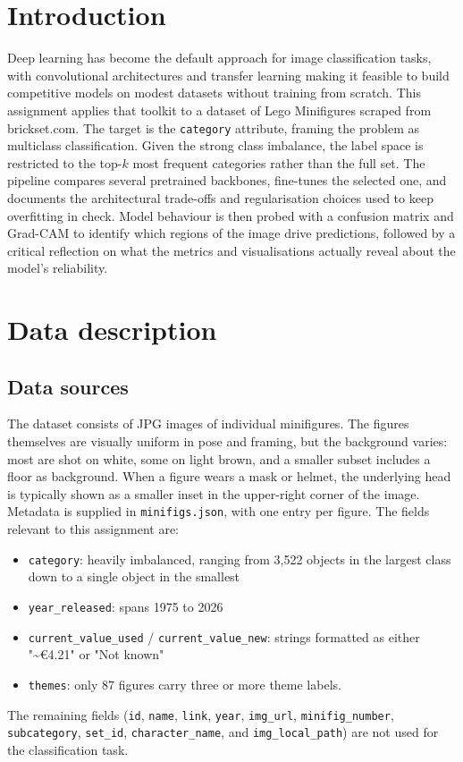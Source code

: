 \section{Introduction}

Deep learning has become the default approach for image classification tasks, with convolutional architectures and transfer learning making it feasible to build competitive models on modest datasets without training from scratch.
This assignment applies that toolkit to a dataset of Lego Minifigures scraped from brickset.com. The target is the \texttt{category} attribute, framing the problem as multiclass classification. Given the strong class imbalance, the label space is restricted to the top-$k$ most frequent categories rather than the full set. The pipeline compares several pretrained backbones, fine-tunes the selected one, and documents the architectural trade-offs and regularisation choices used to keep overfitting in check. Model behaviour is then probed with a confusion matrix and Grad-CAM to identify which regions of the image drive predictions, followed by a critical reflection on what the metrics and visualisations actually reveal about the model's reliability.

\section{Data description}
\subsection{Data sources}
The dataset consists of JPG images of individual minifigures. The figures themselves are visually uniform in pose and framing, but the background varies: most are shot on white, some on light brown, and a smaller subset includes a floor as background. When a figure wears a mask or helmet, the underlying head is typically shown as a smaller inset in the upper-right corner of the image.
Metadata is supplied in \texttt{minifigs.json}, with one entry per figure. The fields relevant to this assignment are:
\begin{itemize}
    \item \texttt{category}: heavily imbalanced, ranging from 3,522 objects in the largest class down to a single object in the smallest
    \item \texttt{year\_released}: spans 1975 to 2026
    \item \texttt{current\_value\_used} / \texttt{current\_value\_new}: strings formatted as either "\textasciitilde{}€4.21" or "Not known"
    \item \texttt{themes}: only 87 figures carry three or more theme labels.
\end{itemize}
The remaining fields (\texttt{id}, \texttt{name}, \texttt{link}, \texttt{year}, \texttt{img\_}\allowbreak\texttt{url}, \texttt{minifig\_}\allowbreak\texttt{number}, \texttt{subcategory}, \texttt{set\_}\allowbreak\texttt{id}, \texttt{character\_}\allowbreak\texttt{name}, and \texttt{img\_}\allowbreak\texttt{local\_}\allowbreak\texttt{path}) are not used for the classification task.

